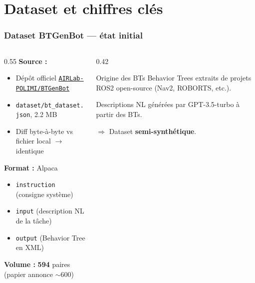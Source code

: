 \documentclass[aspectratio=169]{beamer}
\begin{document}
\section{Dataset et chiffres clés}

\begin{frame}
  \frametitle{Dataset BTGenBot --- état initial}

  \begin{columns}[T]
    \begin{column}{0.55\textwidth}
      \textbf{Source :}
      \begin{itemize}\itemsep2pt
        \item Dépôt officiel \href{https://github.com/AIRLab-POLIMI/BTGenBot}{\texttt{AIRLab-POLIMI/BTGenBot}}
        \item \texttt{dataset/bt\_dataset.json}, 2.2 MB
        \item Diff byte-à-byte vs fichier local $\to$ identique
      \end{itemize}

      \vspace{0.5em}
      \textbf{Format :} Alpaca
      \begin{itemize}\itemsep2pt
        \item \texttt{instruction} (consigne système)
        \item \texttt{input} (description NL de la tâche)
        \item \texttt{output} (Behavior Tree en XML)
      \end{itemize}

      \vspace{0.5em}
      \textbf{Volume :} \textbf{594} paires (papier annonce $\sim$600)
    \end{column}
    \begin{column}{0.42\textwidth}
      \begin{exampleblock}{Origine des BTs}
        \small Behavior Trees extraits de projets ROS2 open-source (Nav2, ROBORTS, etc.).

        \vspace{0.3em}
        Descriptions NL générées par GPT-3.5-turbo à partir des BTs.

        \vspace{0.3em}
        $\Rightarrow$ Dataset \textbf{semi-synthétique}.
      \end{exampleblock}
    \end{column}
  \end{columns}
\end{frame}
\end{document}
